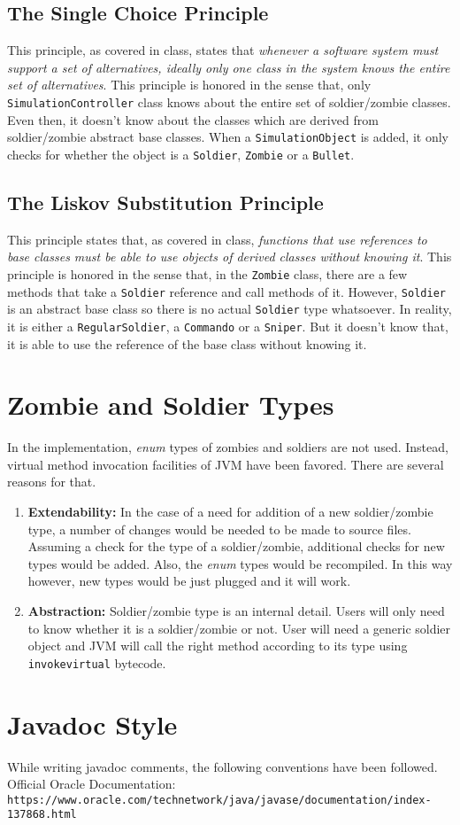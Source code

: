 \documentclass[12pt]{article}
\begin{document}
\subsection{The Single Choice Principle}
This principle, as covered in class, states that \emph{whenever
  a software system must support a set of alternatives, ideally
  only one class in the system knows the entire set of alternatives}.
  This principle is honored in the sense that, only
  \texttt{SimulationController} class knows about the entire set of
  soldier/zombie classes. Even then, it doesn't know about the classes
  which are derived from soldier/zombie abstract base classes. When
  a \texttt{SimulationObject} is added, it only checks for whether
  the object is a \texttt{Soldier}, \texttt{Zombie} or a
  \texttt{Bullet}.

\subsection{The Liskov Substitution Principle}
This principle states that, as covered in class, \emph{functions
  that use references to base classes must be able to use objects
    of derived classes without knowing it}. This principle is honored
    in the sense that, in the \texttt{Zombie} class, there are a few
    methods that take a \texttt{Soldier} reference and call methods
    of it. However, \texttt{Soldier} is an abstract base class so
    there is no actual \texttt{Soldier} type whatsoever. In reality,
    it is either a \texttt{RegularSoldier}, a \texttt{Commando} or a
    \texttt{Sniper}. But it doesn't know that, it is able to use
    the reference of the base class without knowing it.

\section{Zombie and Soldier Types}
In the implementation, \textit{enum} types of zombies and soldiers
  are not used. Instead, virtual method invocation facilities
  of JVM have been favored. There are several reasons for that.
  \begin{enumerate}
    \item \textbf{Extendability:} In the case of a need
      for addition of a new soldier/zombie type, a number of
      changes would be needed to be made to source files.
      Assuming a check for the type of a soldier/zombie,
      additional checks for new types would be added.
      Also, the \textit{enum} types would be recompiled.
      In this way however, new types would be just plugged and it
      will work.
    \item \textbf{Abstraction:} Soldier/zombie type is an
      internal detail. Users will only need to know whether it
      is a soldier/zombie or not. User will need a generic soldier
      object and JVM will call the right method according to its
      type using \texttt{invokevirtual} bytecode.
  \end{enumerate}

\section{Javadoc Style}
While writing javadoc comments, the following conventions have
  been followed.\\
  Official Oracle Documentation:\\
  \texttt{https://www.oracle.com/technetwork/java/javase/documentation/index-137868.html}
\end{document}
